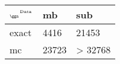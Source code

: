 \begin{tabular}{lll}
    \toprule
    $_{\text{\tiny{\ggn}}}$$^{\text{\tiny{Data}}}$ & mb & sub \\
    \midrule
    exact & 4416
              & 21453 \\
    mc   & 23723
              & > 32768 \\
    \bottomrule
\end{tabular}
